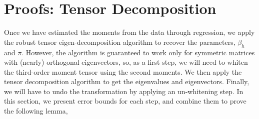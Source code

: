 
\section{Proofs: Tensor Decomposition}
\label{sec:proofs:tensors}

Once we have estimated the moments from the data through regression, we apply the robust tensor eigen-decomposition algorithm to recover the parameters, $\beta_h$ and $\pi$. However, the algorithm is guaranteed to work only for symmetric matrices with (nearly) orthogonal eigenvectors, so, as a first step, we will need to whiten the third-order moment tensor using the second moments. We then apply the tensor decomposition algorithm to get the eigenvalues and eigenvectors. Finally, we will have to undo the transformation by applying an un-whitening step. In this section, we present error bounds for each step, and combine them to prove the following lemma,
